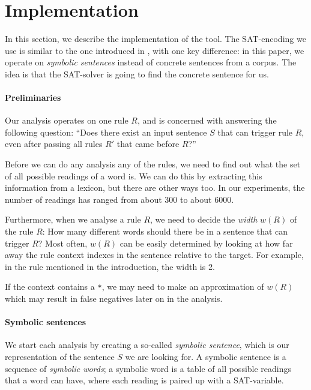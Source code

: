 \section{Implementation}
\label{sec:implementation}

In this section, we describe the implementation of the tool.
The SAT-encoding we use is similar to the one introduced in \cite{listenmaa_claessen2015}, with one key difference: in this paper, we operate on {\em symbolic sentences} instead of concrete sentences from a corpus. The idea is that the SAT-solver is going to find the concrete sentence for us.

\paragraph{Preliminaries}

Our analysis operates on one rule $R$, and is concerned with answering the following question: ``Does there exist an input sentence $S$ that can trigger rule $R$, even after passing all rules $R'$ that came before $R$?''

Before we can do any analysis any of the rules, we need to find out what the set of all possible readings of a word is. We can do this by extracting this information from a lexicon, but there are other ways too. In our experiments, the number of readings has ranged from about 300 to about 6000. 

Furthermore, when we analyse a rule $R$, we need to decide the {\em width} $w(R)$ of the rule $R$: How many different words should there be in a sentence that can trigger $R$? Most often, $w(R)$ can be easily determined by looking at how far away the rule context indexes in the sentence relative to the target. For example, in the rule mentioned in the introduction, the width is 2.

If the context contains a \verb!*!,
we may need to make an approximation of $w(R)$ which may result in false negatives later on in the analysis.

\paragraph{Symbolic sentences}

We start each analysis by creating a so-called {\em symbolic sentence}, which is our representation of the sentence $S$ we are looking for. A symbolic sentence is a sequence of {\em symbolic words}; a symbolic word is a table of all possible readings that a word can have, where each reading is paired up with a SAT-variable.

